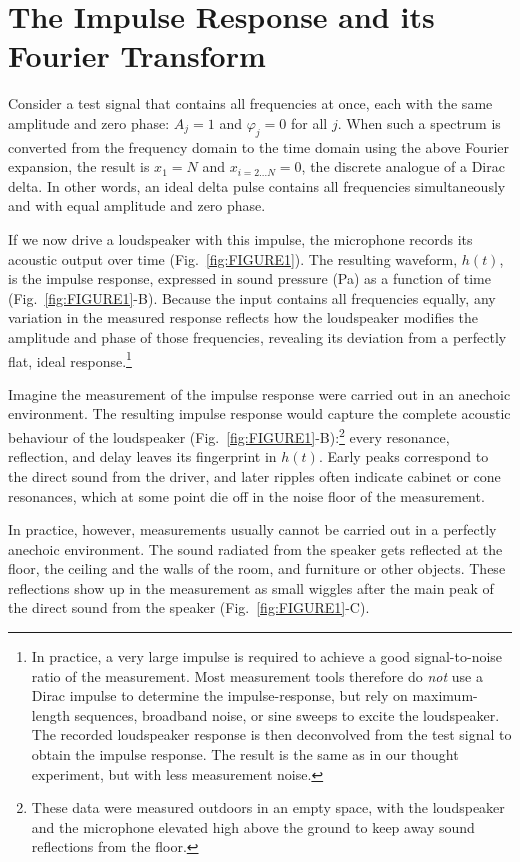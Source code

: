 \documentclass[12pt,a4paper]{article}
\providecommand{\seclabel}[1]{\label{sec:#1}}
\providecommand{\figr}[1]{Fig.~\ref{fig:#1}}
\begin{document}
\section{The Impulse Response and its Fourier Transform}\seclabel{impulse_response}

Consider a test signal that contains all frequencies at once, each with the same amplitude and zero phase: $A_j = 1$ and $\varphi_j = 0$ for all $j$. When such a spectrum is converted from the frequency domain to the time domain using the above Fourier expansion, the result is $x_1 = N$ and $x_{i=2\ldots N} = 0$, the discrete analogue of a Dirac delta. In other words, an ideal delta pulse contains all frequencies simultaneously and with equal amplitude and zero phase.

If we now drive a loudspeaker with this impulse, the microphone records its acoustic output over time (\figr{FIGURE1}).  
The resulting waveform, $h(t)$, is the impulse response, expressed in sound pressure (Pa) as a function of time (\mbox{\figr{FIGURE1}-B}). Because the input contains all frequencies equally, any variation in the measured response reflects how the loudspeaker modifies the amplitude and phase of those frequencies, revealing its deviation from a perfectly flat, ideal response.\footnote{In practice, a very large impulse is required to achieve a good signal-to-noise ratio of the measurement. Most measurement tools therefore do \emph{not} use a Dirac impulse to determine the impulse-response, but rely on maximum-length sequences, broadband noise, or sine sweeps to excite the loudspeaker. The recorded loudspeaker response is then deconvolved from the test signal to obtain the impulse response. The result is the same as in our thought experiment, but with less measurement noise.}

Imagine the measurement of the impulse response were carried out in an anechoic environment. The resulting impulse response would capture the complete acoustic behaviour of the loudspeaker (\mbox{\figr{FIGURE1}-B}):\footnote{These data were measured outdoors in an empty space, with the loudspeaker and the microphone elevated high above the ground to keep away sound reflections from the floor.} every resonance, reflection, and delay leaves its fingerprint in $h(t)$. Early peaks correspond to the direct sound from the driver, and later ripples often indicate cabinet or cone resonances, which at some point die off in the noise floor of the measurement.

In practice, however, measurements usually cannot be carried out in a perfectly anechoic environment. The sound radiated from the speaker gets reflected at the floor, the ceiling and the walls of the room, and furniture or other objects. These reflections show up in the measurement as small wiggles after the main peak of the direct sound from the speaker (\mbox{\figr{FIGURE1}-C}).
\end{document}

